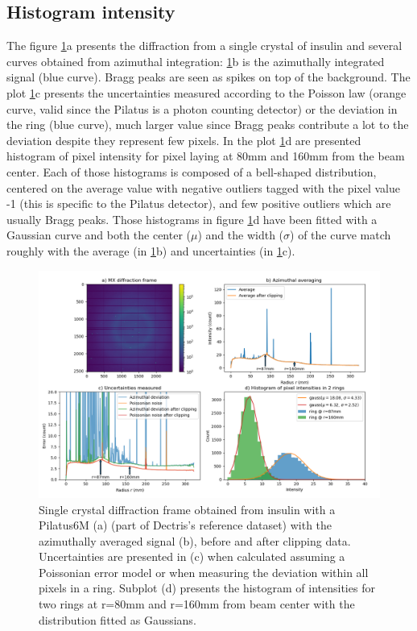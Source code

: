 \documentclass[preprint]{iucr}              %
\begin{document}
\subsection{Histogram intensity }

The figure \ref{fig1}a presents the diffraction from a single crystal of insulin and several curves obtained from azimuthal integration: 
\ref{fig1}b is the azimuthally integrated signal (blue curve). Bragg peaks are seen as spikes on top of the background.
The plot \ref{fig1}c presents the uncertainties measured according to the Poisson law (orange curve, valid since the Pilatus is a photon counting detector) 
or the deviation in the ring (blue curve), much larger value since Bragg peaks contribute a lot to the deviation despite they represent few pixels.         
In the plot \ref{fig1}d are presented histogram of pixel intensity for  pixel laying at 80mm and 160mm from the beam center. 
Each of those histograms is composed of a bell-shaped distribution, centered on the average value with negative outliers tagged with the pixel value -1
(this is specific to the Pilatus detector), and few positive outliers which are usually Bragg peaks.   
Those histograms in figure \ref{fig1}d have been fitted with a Gaussian curve and both the center ($\mu$) and the width ($\sigma$) of the curve match 
roughly with the average (in \ref{fig1}b) and uncertainties (in \ref{fig1}c).  
\begin{figure}
\label{fig1}
\begin{center}
\includegraphics[width=14cm]{fig1}
\caption{Single crystal diffraction frame obtained from insulin with a Pilatus6M (a) (part of Dectris's reference dataset) with the azimuthally averaged signal (b), 
before and after clipping data. Uncertainties are presented in (c) when calculated assuming a Poissonian error model or when measuring the deviation within all pixels in a ring.
Subplot (d) presents the histogram of intensities for two rings at r=80mm and r=160mm from beam center with the distribution fitted as Gaussians.}
\end{center}
\end{figure}
\end{document}
